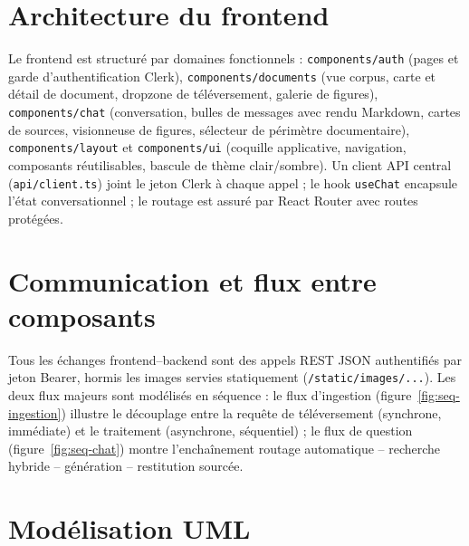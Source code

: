 \section{Architecture du frontend}

Le frontend est structuré par domaines fonctionnels : \texttt{components/auth} (pages et
garde d'authentification Clerk), \texttt{components/documents} (vue corpus, carte et détail
de document, dropzone de téléversement, galerie de figures), \texttt{components/chat}
(conversation, bulles de messages avec rendu Markdown, cartes de sources, visionneuse de
figures, sélecteur de périmètre documentaire), \texttt{components/layout} et
\texttt{components/ui} (coquille applicative, navigation, composants réutilisables, bascule
de thème clair/sombre). Un client API central (\texttt{api/client.ts}) joint le jeton Clerk
à chaque appel ; le hook \texttt{useChat} encapsule l'état conversationnel ; le routage est
assuré par React Router avec routes protégées.



\section{Communication et flux entre composants}
\label{sec:flux}

Tous les échanges frontend--backend sont des appels REST JSON authentifiés par jeton
Bearer, hormis les images servies statiquement (\texttt{/static/images/...}). Les deux flux
majeurs sont modélisés en séquence : le flux d'ingestion
(figure~\ref{fig:seq-ingestion}) illustre le découplage entre la requête de téléversement
(synchrone, immédiate) et le traitement (asynchrone, séquentiel) ; le flux de question
(figure~\ref{fig:seq-chat}) montre l'enchaînement routage automatique -- recherche hybride
-- génération -- restitution sourcée.



\section{Modélisation UML}
\label{sec:uml}

